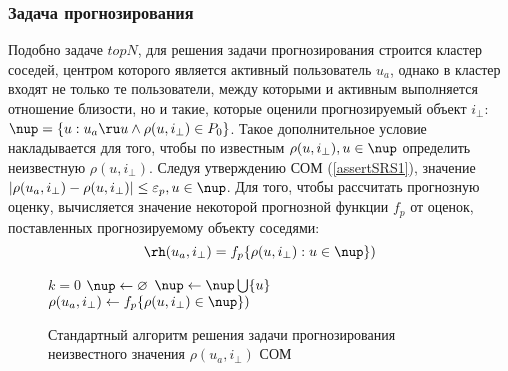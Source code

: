 
\subsubsection{Задача прогнозирования}
Подобно задаче $topN$, для решения задачи прогнозирования \cite{cf-expert,
coscial-rec-survey, cfrs, toward,rs-handbook, user-item-cf,rs-cf}
строится кластер соседей, центром которого является активный пользователь
$u_a$, однако в кластер входят не только те пользователи, между которыми
и активным выполняется отношение близости, но и такие, которые оценили
прогнозируемый объект $i_{\bot}$:
$\nup = \{u: u_a \ru u \wedge \rho(u,i_{\bot}) \in P_0\}$. Такое дополнительное
условие накладывается для того, чтобы по известным $\rho(u, i_{\bot}), u \in \nup$
определить неизвестную $\rho(u,i_{\bot})$.
Следуя утверждению СОМ (\ref{assertSRS1}), значение $|\rho(u_a,i_{\bot}) -
\rho(u,i_{\bot})| \le
\varepsilon_p, u \in \nup$.
Для того, чтобы рассчитать прогнозную оценку,
вычисляется значение некоторой прогнозной функции $f_p$
от оценок, поставленных прогнозируемому объекту соседями:
\begin{equation}
  \rh(u_a,i_{\bot}) = f_p\{ \rho(u,i_{\bot}): u \in \nup \})
\end{equation}

\begin{figure}[h]
	\label{p-solve-srs}
	\begin{algorithm}
		\caption{Стандартный алгоритм решения задачи прогнозирования неизвестного значения
		$\rho(u_a,i_{\bot})$ СОМ}
		\begin{algorithmic}[1]
			\State $k = 0$
			\State $\nup \gets \varnothing$
			 
			\State $\nup \gets \nup \bigcup \{ u \}$
			\EndIf
			\EndFor
			\State $\rho(u_a,i_{\bot}) \gets f_p\{ \rho(u,i_{\bot}) \in \nup \})$
		\end{algorithmic}
	\end{algorithm}
\end{figure}
